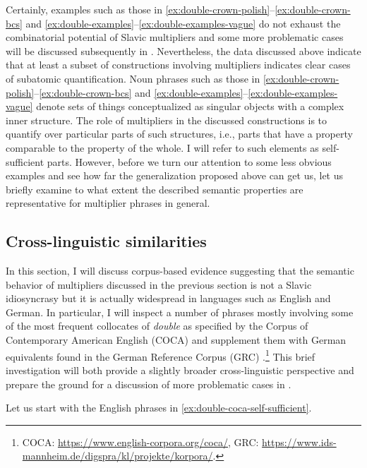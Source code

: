 Certainly, examples such as those in \ref{ex:double-crown-polish}--\ref{ex:double-crown-bcs} and \ref{ex:double-examples}--\ref{ex:double-examples-vague} do not exhaust the combinatorial potential of Slavic multipliers and some more problematic cases will be discussed subsequently in . Nevertheless, the data discussed above indicate that at least a subset of constructions involving multipliers indicates clear cases of subatomic quantification. Noun phrases such as those in \ref{ex:double-crown-polish}--\ref{ex:double-crown-bcs} and \ref{ex:double-examples}--\ref{ex:double-examples-vague} denote sets of things conceptualized as singular objects with a complex inner structure. The role of multipliers in the discussed constructions is to quantify over particular parts of such structures, i.e., parts that have a property comparable to the property of the whole. I will refer to such elements as self-sufficient parts. However, before we turn our attention to some less obvious examples and see how far the generalization proposed above can get us, let us briefly examine to what extent the described semantic properties are representative for multiplier phrases in general.

\subsection{Cross-linguistic similarities}\label{sec:cross-linguistic-similarities}

In this section, I will discuss corpus-based evidence suggesting that the semantic behavior of multipliers discussed in the previous section is not a Slavic idiosyncrasy but it is actually widespread in languages such as English and German. In particular, I will inspect a number of phrases mostly involving some of the most frequent collocates of \textit{double} as specified by the Corpus of Contemporary American English (COCA) \citep{davies2009coca} and supplement them with German equivalents found in the German Reference Corpus (GRC) \citep{kupietz_keibel2009mannheim}.\footnote{COCA: \url{https://www.english-corpora.org/coca/}, GRC: \url{https://www.ids-mannheim.de/digspra/kl/projekte/korpora/}.} This brief investigation will both provide a slightly broader cross-linguistic perspective and prepare the ground for a discussion of more problematic cases in .

Let us start with the English phrases in \ref{ex:double-coca-self-sufficient}.

